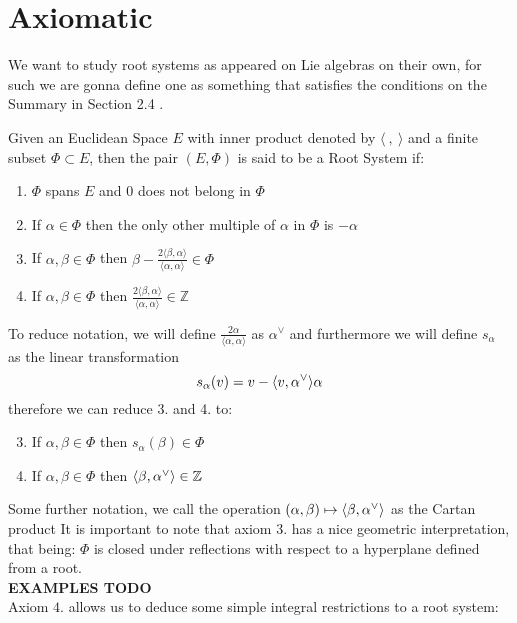 \section{Axiomatic}
We want to study root systems as appeared on Lie algebras on their own, for such we are gonna define one as something that satisfies the conditions on the Summary in Section 2.4 .\\
\begin{defi}
Given an Euclidean Space $E$ with inner product denoted by $\langle\ , \  \rangle$ and a finite subset $\Phi \subset E$, then the pair $(E,\Phi)$ is said to be a Root System if:
\begin{enumerate}
\item $\Phi$ spans $E$ and $0$ does not belong in $\Phi$
\item If $\alpha \in \Phi$ then the only other multiple of $\alpha$ in $\Phi$ is $-\alpha$
\item If $\alpha,\beta \in \Phi$ then $\beta-\frac{2\langle \beta,\alpha\rangle}{\langle \alpha,\alpha \rangle} \in \Phi$
\item If $\alpha,\beta \in \Phi$ then $\frac{2\langle \beta,\alpha\rangle}{\langle \alpha,\alpha \rangle} \in \mathbb{Z}$
\end{enumerate}
To reduce notation, we will define $\frac{2\alpha}{\langle \alpha,\alpha\rangle}$ as $\alpha^\lor$ and furthermore we will define $s_\alpha$ as the linear transformation 
$$s_\alpha(v) = v - \langle {v},{\alpha}^\lor\rangle\alpha$$ therefore we can reduce 3. and 4. to:
\begin{enumerate}[label=\arabic*b.]
	\setcounter{enumi}{2}
	\item If $\alpha,\beta \in \Phi$ then $s_\alpha(\beta)\in \Phi$
	\item If $\alpha,\beta \in \Phi$ then $\langle {\beta},{\alpha}^\lor\rangle \in \mathbb{Z}$
\end{enumerate}
\end{defi}
Some further notation, we call the operation $(\alpha,\beta)\mapsto \langle {\beta},{\alpha}^\lor\rangle$ as the Cartan product 
It is important to note that axiom $3.$ has a nice geometric interpretation, that being: $\Phi$ is closed under reflections with respect to a hyperplane defined from a root.\\
\textbf{EXAMPLES TODO}\\
Axiom $4.$ allows us to deduce some simple integral restrictions to a root system:
